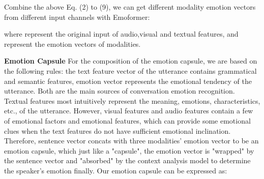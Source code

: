 \documentclass[11pt]{article}
\begin{document}
Combine the above Eq. (2) to (9), we can get different modality emotion vectors from different input channels with Emoformer:
	
where  represent the original input of audio,visual and textual features, and  represent the emotion vectors of modalities. 

\noindent\textbf{Emotion Capsule} For the composition of the emotion capsule, we are based on the following rules: the text feature vector of the utterance contains grammatical and semantic features, emotion vector represents the emotional tendency of the utterance. Both are the main sources of conversation emotion recognition. Textual features most intuitively represent the meaning, emotions, characteristics, etc., of the utterance. However, visual features and audio features contain a few of emotional factors and emotional features, which can provide some emotional clues when the text features do not have sufficient emotional inclination. Therefore, sentence vector concats with three modalities' emotion vector to be an emotion capsule, which just like a "capsule", the emotion vector is "wrapped" by the sentence vector and "absorbed" by the context analysis model to determine the speaker's emotion finally. Our emotion capsule  can be expressed as:
	
\end{document}
